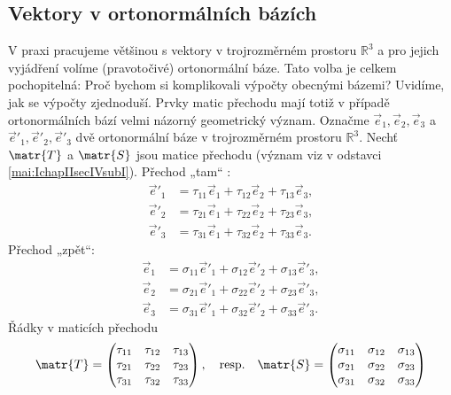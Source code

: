       \subsection{Vektory v ortonormálních bázích}\label{mai:IchapIIsecIVsubIV} 
        V praxi pracujeme většinou s vektory v trojrozměrném prostoru \(\mathbb{R}^3\) a pro jejich
        vyjádření volíme (pravotočivé) ortonormální báze. Tato volba je celkem pochopitelná: Proč
        bychom si komplikovali výpočty obecnými bázemi? Uvidíme, jak se výpočty zjednoduší. Prvky
        matic přechodu mají totiž v případě ortonormálních bází velmi názorný geometrický význam.
        Označme \(\vec{e}_1, \vec{e}_2, \vec{e}_3\) a \(\vec{e}'_1, \vec{e}'_2, \vec{e}'_3\) dvě
        ortonormální báze v trojrozměrném prostoru \(\mathbb{R}^3\). Nechť \(\matr{T}\) a
        \(\matr{S}\) jsou matice přechodu (význam viz v odstavci \ref{mai:IchapIIsecIVsubI}).
        Přechod „tam“ :
        \begin{align*}
          \vec{e}'_1&=\tau_{11}\vec{e}_1+\tau_{12}\vec{e}_2+\tau_{13}\vec{e}_3,    \\
          \vec{e}'_2&=\tau_{21}\vec{e}_1+\tau_{22}\vec{e}_2+\tau_{23}\vec{e}_3,    \\
          \vec{e}'_3&=\tau_{31}\vec{e}_1+\tau_{32}\vec{e}_2+\tau_{33}\vec{e}_3.    
        \end{align*}
        Přechod „zpět“:
        \begin{align*}
          \vec{e}_1&=\sigma_{11}\vec{e}'_1+\sigma_{12}\vec{e}'_2+\sigma_{13}\vec{e}'_3,    \\
          \vec{e}_2&=\sigma_{21}\vec{e}'_1+\sigma_{22}\vec{e}'_2+\sigma_{23}\vec{e}'_3,    \\
          \vec{e}_3&=\sigma_{31}\vec{e}'_1+\sigma_{32}\vec{e}'_2+\sigma_{33}\vec{e}'_3.    
        \end{align*}
        Řádky v maticích přechodu
        \begingroup
          \renewcommand\arraystretch{1.0}
          \renewcommand\arraycolsep{3pt}
          \begin{gather*}
            \matr{T} = 
            \begin{pmatrix}
              \tau_{11} & \tau_{12} & \tau_{13}    \\
              \tau_{21} & \tau_{22} & \tau_{23}    \\
              \tau_{31} & \tau_{32} & \tau_{33}
            \end{pmatrix}, \quad\text{resp.}\quad
            \matr{S} = 
            \begin{pmatrix}
              \sigma_{11} & \sigma_{12} & \sigma_{13}    \\
              \sigma_{21} & \sigma_{22} & \sigma_{23}    \\
              \sigma_{31} & \sigma_{32} & \sigma_{33}
            \end{pmatrix}
          \end{gather*} 
        \endgroup
